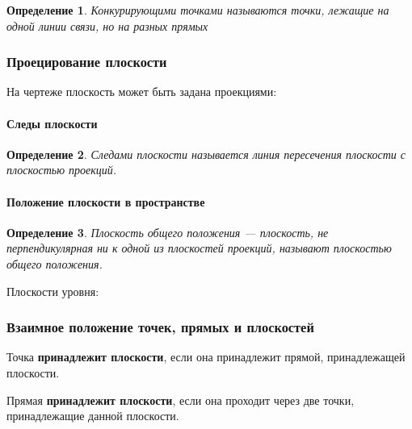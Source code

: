 \documentclass{article}
\newtheorem{definition}{Определение}
\begin{document}
\begin{flushleft}
\begin{definition}
    Конкурирующими точками называются точки, лежащие на одной линии связи, но на разных прямых
\end{definition}

\subsubsection{Проецирование плоскости}

На чертеже плоскость может быть задана проекциями:

\begin{multienumerate}
\end{multienumerate}

\paragraph{Следы плоскости}

\begin{definition}
    Следами плоскости называется линия пересечения плоскости с плоскостью проекций.
\end{definition}

\paragraph{Положение плоскости в пространстве}

\begin{definition}
    Плоскость общего положения — плоскость, не перпендикулярная ни к одной из плоскостей проекций, называют плоскостью общего положения.
\end{definition}

Плоскости уровня:

\begin{multienumerate}
\end{multienumerate}

\subsubsection{Взаимное положение точек, прямых и плоскостей}

Точка \textbf{принадлежит плоскости}, если она принадлежит прямой, принадлежащей плоскости.

Прямая \textbf{принадлежит плоскости}, если она проходит через две точки, принадлежащие данной плоскости.

\end{flushleft}
\end{document}
